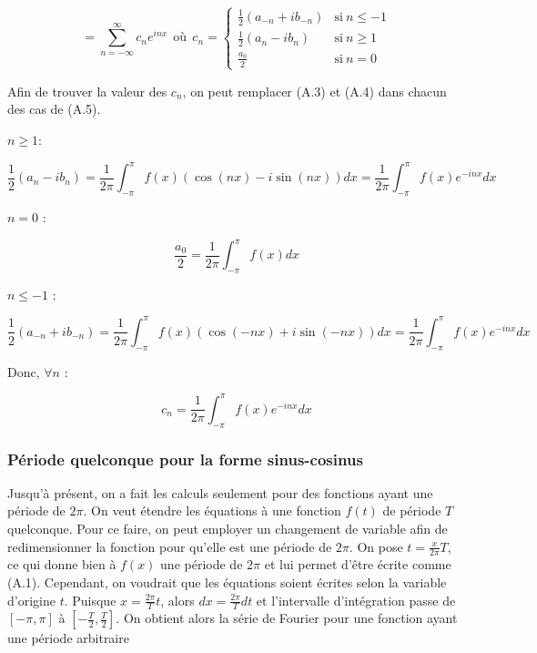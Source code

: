 \begin{equation}
    = \sum_{n= -\infty}^{\infty} c_n e^{inx} \ \ \text{où} \ \ c_n = \begin{cases}
        \frac{1}{2}(a_{-n} + ib_{-n}) & \text{si} \ n \leq -1 \\
        \frac{1}{2}(a_{n} - ib_{n}) & \text{si} \ n \geq 1 \\
        \frac{a_0}{2} & \text{si} \ n = 0 
    \end{cases}
\end{equation}

Afin de trouver la valeur des $c_n$, on peut remplacer (A.3) et (A.4) dans chacun des cas de (A.5).

$n \geq 1$:

\begin{equation*}
    \frac{1}{2}(a_n - ib_n) = \frac{1}{2\pi}\int_{-\pi}^{\pi} f(x)\left(\cos(nx) - i \sin(nx)\right) dx = \frac{1}{2\pi}\int_{-\pi}^{\pi}f(x)e^{-inx}dx
\end{equation*}

$n = 0$ :

\begin{equation*}
    \frac{a_0}{2} = \frac{1}{2\pi}\int_{-\pi}^{\pi}f(x)dx
\end{equation*}

$n \leq -1$ : 

\begin{equation*}
    \frac{1}{2}(a_{-n} + ib_{-n}) = \frac{1}{2\pi}\int_{-\pi}^{\pi}f(x)\left(\cos(-nx) + i \sin(-nx)\right) dx = \frac{1}{2\pi}\int_{-\pi}^{\pi}f(x)e^{-inx} dx
\end{equation*}

Donc, $\forall n$ :

\begin{equation}
    c_n = \frac{1}{2\pi}\int_{-\pi}^{\pi}f(x)e^{-inx}dx
\end{equation}

\subsubsection*{Période quelconque pour la forme sinus-cosinus}
Jusqu'à présent, on a fait les calculs seulement pour des fonctions ayant une période de $2\pi$. On veut étendre les équations à une fonction $f(t)$ de période $T$ quelconque. Pour ce faire, on peut employer un changement de variable afin de redimensionner la fonction pour qu'elle est une période de $2\pi$. On pose $t = \frac{x}{2\pi} T$, ce qui donne bien à $f(x)$ une période de $2\pi$ et lui permet d'être écrite comme (A.1). Cependant, on voudrait que les équations soient écrites selon la variable d'origine $t$. Puisque $x = \frac{2\pi}{T}t$, alors $dx = \frac{2\pi}{T}dt$ et l'intervalle d'intégration passe de $[-\pi,\pi]$ à $[-\frac{T}{2}, \frac{T}{2}]$. On obtient alors la série de Fourier pour une fonction ayant une période arbitraire

